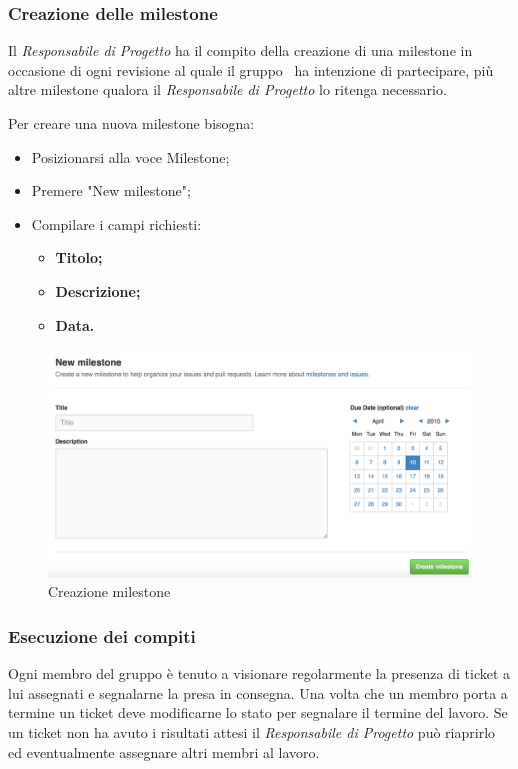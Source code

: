 \newpage
\subsubsection{Creazione delle milestone}

Il \textit{Responsabile di Progetto} ha il compito della creazione di una \gls{milestone} in occasione di ogni revisione al quale il gruppo \GRUPPO\ ha intenzione di partecipare, più altre \gls{milestone} qualora il \textit{Responsabile di Progetto} lo ritenga necessario.

Per creare una nuova \gls{milestone} bisogna:

\begin{itemize}
	\item Posizionarsi alla voce \gls{Milestone};
	\item Premere "New \gls{milestone}";
	\item Compilare i campi richiesti:
	\begin{itemize}
		\item \textbf{Titolo;}
		\item \textbf{Descrizione;}
		\item \textbf{Data.}
	\end{itemize}
\end{itemize}
\begin{figure}[h]
	\centering
	\includegraphics[width=0.7\linewidth]{img/milestone}
	\caption[Creazione milestone]{Creazione milestone}
	\label{fig:milestone}
\end{figure}

\subsubsection{Esecuzione dei compiti}

Ogni membro del gruppo è tenuto a visionare regolarmente la presenza di \gls{ticket} a lui assegnati e segnalarne la presa in consegna.
Una volta che un membro porta a termine un \gls{ticket} deve modificarne lo stato per segnalare il termine del lavoro.
Se un \gls{ticket} non ha avuto i risultati attesi il \textit{Responsabile di Progetto} può riaprirlo ed eventualmente assegnare altri membri al lavoro.

